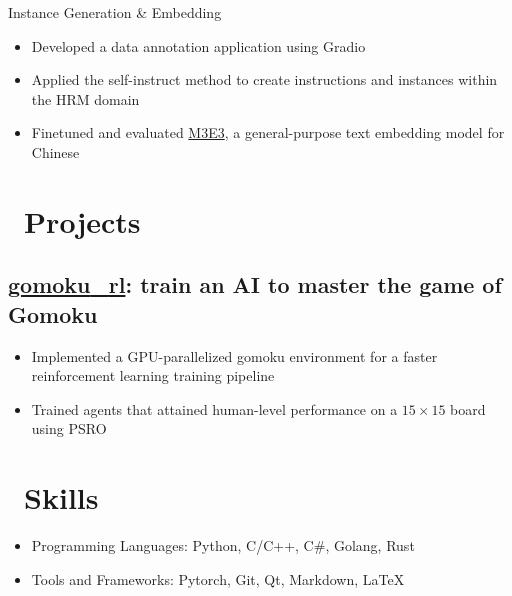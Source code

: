 \documentclass{resume}
\begin{document}
Instance Generation \& Embedding
\begin{itemize}
  \item Developed a data annotation application using Gradio
  \item Applied the self-instruct method to create instructions and instances within the HRM domain
  \item Finetuned and evaluated \href{https://huggingface.co/moka-ai/m3e-base}{M3E3}, a general-purpose text embedding model for Chinese
\end{itemize}

\section{\faRocket\ Projects}

\subsection{\faGithub\space\textbf{\href{https://github.com/hesic73/gomoku_rl}{gomoku{\_}rl}}: train an AI to master the game of Gomoku}

\begin{itemize}
  \item Implemented a GPU-parallelized gomoku environment for a faster reinforcement learning training pipeline
  \item Trained agents that attained human-level performance on a $15\times15$ board using PSRO
\end{itemize}


\section{\faCogs\ Skills}
\begin{itemize}[parsep=0.5ex]
  \item Programming Languages: Python, C/C++, C\#, Golang, Rust
  \item Tools and Frameworks: Pytorch, Git, Qt, Markdown, \LaTeX
\end{itemize}



%
%
\end{document}
